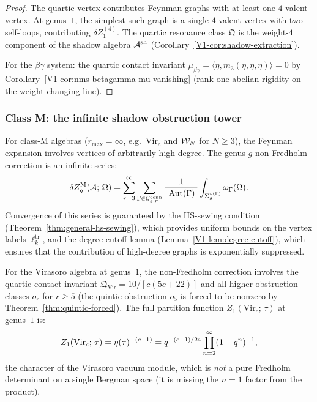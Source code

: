 \begin{proof}
The quartic vertex contributes Feynman graphs with at least one
$4$-valent vertex. At genus~$1$, the simplest such graph is a
single $4$-valent vertex with two self-loops, contributing
$\delta Z_1^{(4)}$. The quartic resonance class $\mathfrak{Q}$
is the weight-$4$ component of the shadow algebra $\mathcal{A}^{\mathrm{sh}}$
(Corollary~\ref*{V1-cor:shadow-extraction}).

For the $\beta\gamma$ system: the quartic contact invariant
$\mu_{\beta\gamma} = \langle \eta, m_3(\eta,\eta,\eta)\rangle = 0$
by Corollary~\ref*{V1-cor:nms-betagamma-mu-vanishing} (rank-one abelian
rigidity on the weight-changing line).
\end{proof}

\subsubsection{Class M: the infinite shadow obstruction tower}

\begin{remark}%
%
For class-M algebras ($r_{\max} = \infty$, e.g.\ $\mathrm{Vir}_c$
and $\mathcal{W}_N$ for $N \geq 3$), the Feynman expansion involves
vertices of arbitrarily high degree. The genus-$g$ non-Fredholm
correction is an infinite series:
\[
\delta Z_g^{\mathrm{M}}(\mathcal{A};\,\Omega)
= \sum_{r=3}^{\infty}
\sum_{\Gamma \in \mathcal{G}^{\mathrm{conn}}_{g,r}}
\frac{1}{|\operatorname{Aut}(\Gamma)|}
\int_{\Sigma_g^{v(\Gamma)}}
\omega_\Gamma(\Omega).
\]
Convergence of this series is guaranteed by the HS-sewing
condition (Theorem~\ref{thm:general-hs-sewing}), which provides
uniform bounds on the vertex labels $\ell_k^{\mathrm{tr}}$, and
the degree-cutoff lemma (Lemma~\ref{V1-lem:degree-cutoff}), which
ensures that the contribution of high-degree graphs is
exponentially suppressed.

For the Virasoro algebra at genus~$1$, the non-Fredholm
correction involves the quartic contact invariant
$\mathfrak{Q}_{\mathrm{Vir}} = 10/[c(5c+22)]$
and all higher obstruction classes $o_r$ for $r \geq 5$
(the quintic obstruction $o_5$ is forced to be nonzero
by Theorem~\ref{thm:quintic-forced}). The full partition
function $Z_1(\mathrm{Vir}_c;\,\tau)$ at genus~$1$ is:
\[
Z_1(\mathrm{Vir}_c;\,\tau)
= \eta(\tau)^{-(c-1)}
= q^{-(c-1)/24}\prod_{n=2}^{\infty}(1-q^n)^{-1},
\]
the character of the Virasoro vacuum module, which is
\emph{not} a pure Fredholm determinant on a single Bergman space
(it is missing the $n=1$ factor from the product).
\end{remark}

